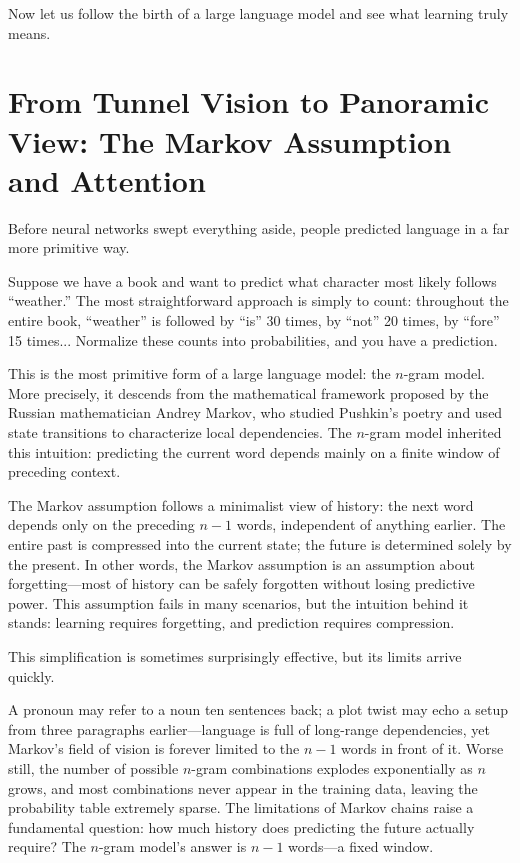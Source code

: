 
Now let us follow the birth of a large language model and see what learning truly means.

\newpage
\section{From Tunnel Vision to Panoramic View: The Markov Assumption and Attention}

Before neural networks swept everything aside, people predicted language in a far more primitive way.

Suppose we have a book and want to predict what character most likely follows ``weather.'' The most straightforward approach is simply to count: throughout the entire book, ``weather'' is followed by ``is'' 30 times, by ``not'' 20 times, by ``fore'' 15 times... Normalize these counts into probabilities, and you have a prediction.

This is the most primitive form of a large language model: the $n$-gram model. More precisely, it descends from the mathematical framework proposed by the Russian mathematician Andrey Markov, who studied Pushkin's poetry and used state transitions to characterize local dependencies. The $n$-gram model inherited this intuition: predicting the current word depends mainly on a finite window of preceding context.

\vspace{1em}

The Markov assumption follows a minimalist view of history: the next word depends only on the preceding $n-1$ words, independent of anything earlier. The entire past is compressed into the current state; the future is determined solely by the present. In other words, the Markov assumption is an assumption about forgetting---most of history can be safely forgotten without losing predictive power. This assumption fails in many scenarios, but the intuition behind it stands: learning requires forgetting, and prediction requires compression.

\vspace{1em}

This simplification is sometimes surprisingly effective, but its limits arrive quickly.

A pronoun may refer to a noun ten sentences back; a plot twist may echo a setup from three paragraphs earlier---language is full of long-range dependencies, yet Markov's field of vision is forever limited to the $n-1$ words in front of it. Worse still, the number of possible $n$-gram combinations explodes exponentially as $n$ grows, and most combinations never appear in the training data, leaving the probability table extremely sparse.
The limitations of Markov chains raise a fundamental question: how much history does predicting the future actually require?
The $n$-gram model's answer is $n-1$ words---a fixed window.

